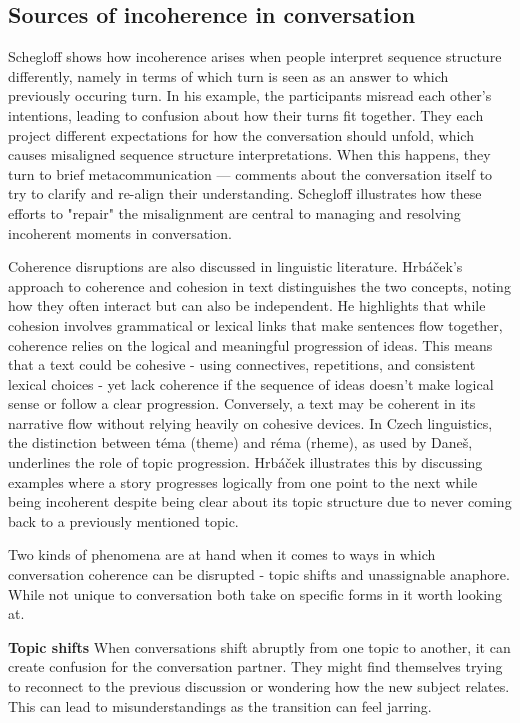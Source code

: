 \documentclass[12pt]{report}
\begin{document}
{\subsection{Sources of incoherence in conversation}
\par
Schegloff shows how incoherence arises when
people interpret sequence structure differently,
namely in terms of which turn is seen as an answer to which previously occuring turn.
In his example, the participants misread each other’s intentions,
leading to confusion about how their turns fit together.
They each project different expectations for how the conversation should unfold,
which causes misaligned sequence structure interpretations.
When this happens,
they turn to brief metacommunication — comments about the conversation itself
to try to clarify and re-align their understanding.
Schegloff illustrates how these
efforts to "repair" the misalignment are central to
managing and resolving incoherent moments in conversation.

\par
Coherence disruptions are also discussed in linguistic literature.
Hrbáček’s approach to coherence and cohesion in text distinguishes the two concepts,
noting how they often interact but can also be independent.
He highlights that while
cohesion involves grammatical or lexical links that
make sentences flow together,
coherence relies on the logical and meaningful progression of ideas.
This means that a text could be cohesive -
using connectives, repetitions, and consistent lexical choices -
yet lack coherence if the sequence of ideas doesn’t
make logical sense or follow a clear progression.
Conversely, a text may be coherent in its narrative flow without
relying heavily on cohesive devices.
In Czech linguistics,
the distinction between téma (theme) and réma (rheme), as used by Daneš,
underlines the role of topic progression.
Hrbáček illustrates this by discussing examples where
a story progresses logically from one point to the next while
being incoherent despite being clear about its topic structure
due to never coming back to a previously mentioned topic.

\par
Two kinds of phenomena are at hand when it comes to
ways in which conversation coherence can be disrupted -
topic shifts and unassignable anaphore.
While not unique to conversation
both take on specific forms in it worth looking at.

\par{\textbf{Topic shifts}}
    When conversations shift abruptly from one topic to another,
    it can create confusion for the conversation partner.
    They might find themselves trying to
    reconnect to the previous discussion or
    wondering how the new subject relates.
    This can lead to misunderstandings
    as the transition can feel jarring.

}
\end{document}
